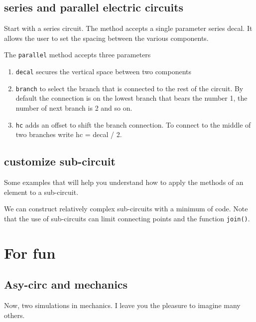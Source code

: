\documentclass[10pt]{article}
\begin{document}
\subsection{series and parallel electric circuits}
Start with a series circuit. The method accepts a single parameter series decal. It allows the user to set the spacing between the various components.\\


The \verb|parallel| method accepts three parameters
\begin{enumerate}
\item \verb|decal| secures the vertical space between two components
\item \verb|branch| to select the branch that is connected to the rest of the circuit. By default the connection is on the lowest branch that bears the number 1, the number of next branch is 2 and so on.
\item \verb|hc| adds an offset to shift the branch connection. To connect to the middle of two branches write hc = decal / 2.\\
\end{enumerate}


\subsection{customize sub-circuit}
Some examples that will help you understand how to apply the methods of an element to a sub-circuit.


We can construct relatively complex sub-circuits with a minimum of code. Note that the use of sub-circuits can limit connecting points and the function \verb|join()|.


\section{For fun}
\subsection{Asy-circ and mechanics}
Now, two simulations in mechanics. I leave you the pleasure to imagine many others.
\end{document}
